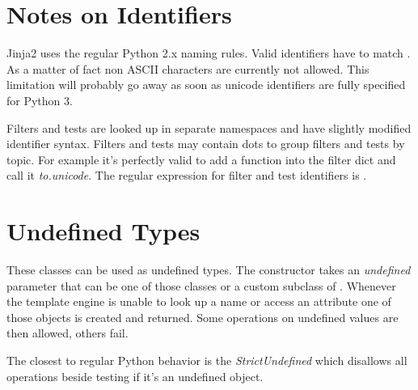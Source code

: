 \documentclass[a4paper,10pt,english]{sphinxmanual}
\begin{document}
\section{Notes on Identifiers}
\label{api:notes-on-identifiers}\label{api:identifier-naming}
Jinja2 uses the regular Python 2.x naming rules.  Valid identifiers have to
match \code{{[}a-zA-Z\_{]}{[}a-zA-Z0-9\_{]}*}.  As a matter of fact non ASCII characters
are currently not allowed.  This limitation will probably go away as soon as
unicode identifiers are fully specified for Python 3.

Filters and tests are looked up in separate namespaces and have slightly
modified identifier syntax.  Filters and tests may contain dots to group
filters and tests by topic.  For example it's perfectly valid to add a
function into the filter dict and call it \emph{to.unicode}.  The regular
expression for filter and test identifiers is
.


\section{Undefined Types}
\label{api:undefined-types}
These classes can be used as undefined types.  The {\hyperref[api:jinja2.Environment]{}}
constructor takes an \emph{undefined} parameter that can be one of those classes
or a custom subclass of {\hyperref[api:jinja2.Undefined]{}}.  Whenever the template engine is
unable to look up a name or access an attribute one of those objects is
created and returned.  Some operations on undefined values are then allowed,
others fail.

The closest to regular Python behavior is the \emph{StrictUndefined} which
disallows all operations beside testing if it's an undefined object.
\end{document}
